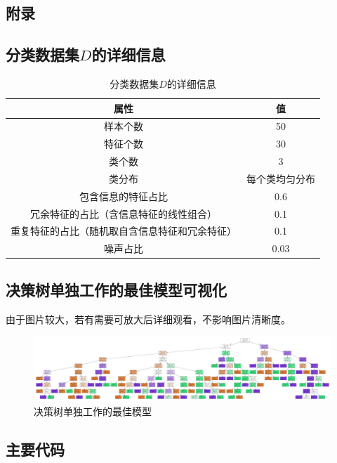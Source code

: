 \documentclass[12pt,a4paper]{article}
\theoremstyle{definition}
\begin{document}
\newpage
\begin{appendix}
	\section{附录}
	\subsection{分类数据集$D$的详细信息}
	\label{apd:dataset_para}
	\begin{table}[H]
		\renewcommand\arraystretch{1.35}
		\caption{分类数据集$D$的详细信息}
		\label{tab:dataset_para}
		\centering
		
		\begin{tabular}{c|c}
			\centering
			属性 & 值 \\
			\hline
			样本个数 & 50 \\
			特征个数 & 30 \\
			类个数 & 3 \\
			类分布 & 每个类均匀分布 \\
			包含信息的特征占比 & 0.6 \\
			冗余特征的占比（含信息特征的线性组合） & 0.1 \\
			重复特征的占比（随机取自含信息特征和冗余特征） & 0.1 \\
			噪声占比 & 0.03 \\		
		\end{tabular}
	\end{table}
	
	\subsection{决策树单独工作的最佳模型可视化}
	由于图片较大，若有需要可放大后详细观看，不影响图片清晰度。
	\label{apd:vis-tree}
	\begin{figure}[H]
		\centering
		\includegraphics[width=0.9\linewidth]{img/gs.pdf}
		\caption{决策树单独工作的最佳模型}
	\end{figure}
	
	\subsection{主要代码}
	\label{apd:code}
	

\end{appendix}
\end{document}
